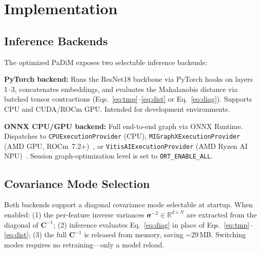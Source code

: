 \documentclass[blind]{gtac}
\begin{document}
\section{Implementation}
\label{sec:implementation}

\subsection{Inference Backends}

The optimized PaDiM exposes two selectable inference backends:

\textbf{PyTorch backend:}  Runs the ResNet18 backbone via
PyTorch hooks on layers 1--3, concatenates embeddings, and evaluates the
Mahalanobis distance via batched tensor contractions
(Eqs.~\eqref{eq:tmp}--\eqref{eq:dist} or Eq.~\eqref{eq:diag}).
Supports CPU and CUDA/ROCm GPU.  Intended for development environments.

\textbf{ONNX CPU/GPU backend:}  Full end-to-end graph via ONNX Runtime.
Dispatches to \texttt{CPUExecutionProvider} (CPU),
\texttt{MIGraphXExecutionProvider} (AMD GPU,
ROCm~7.2+)~\cite{migraphx,rocm}, or \texttt{VitisAIExecutionProvider}
(AMD Ryzen AI NPU)~\cite{vitisai,ryzenai}.  Session graph-optimization level
is set to \texttt{ORT\_ENABLE\_ALL}.

\subsection{Covariance Mode Selection}

Both backends support a diagonal covariance mode selectable at startup.  When
enabled: (1) the per-feature inverse variances
$\boldsymbol{\sigma}^{-2} \in \mathbb{R}^{d \times N}$ are extracted from
the diagonal of $\mathbf{C}^{-1}$; (2) inference evaluates
Eq.~\eqref{eq:diag} in place of Eqs.~\eqref{eq:tmp}--\eqref{eq:dist}; (3)
the full $\mathbf{C}^{-1}$ is released from memory, saving $\sim$29\,MB.
Switching modes requires no retraining---only a model reload.
\end{document}
